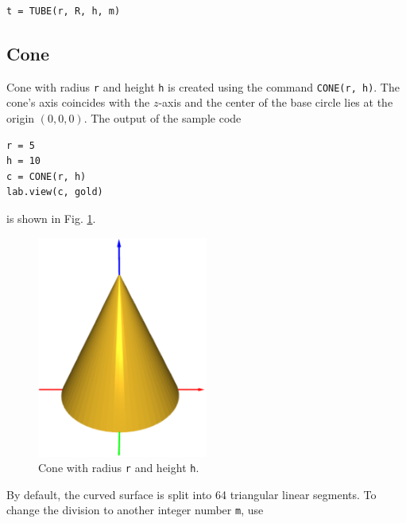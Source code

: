 \begin{bbox}
\begin{verbatim}
t = TUBE(r, R, h, m)
\end{verbatim}
\end{bbox}

\subsection{Cone}\label{par:coco}

Cone with radius {\tt r} and height {\tt h} is created using the command 
{\tt CONE(r, h)}. The cone's axis coincides with the $z$-axis and 
the center of the base circle lies at the origin $(0, 0, 0)$.
The output of the sample code\\

\begin{bbox}
\begin{verbatim}
r = 5
h = 10
c = CONE(r, h)
lab.view(c, gold)
\end{verbatim}
\end{bbox}
\vspace{6mm}

\noindent
is shown in Fig. \ref{fig:convexhull-2a}.\\[-7mm]

\begin{figure}[!ht]
\begin{center}
\includegraphics[width=0.5\textwidth]{img/cone-1.png}
\end{center}
\vspace{-4mm}
\caption{Cone with radius {\tt r} and height {\tt h}.}
\label{fig:convexhull-2a}
\vspace{-1cm}
\end{figure}
\newpage
\noindent
By default, the curved surface is split into 64 triangular linear segments. To 
change the division to another integer number {\tt m}, use\\

